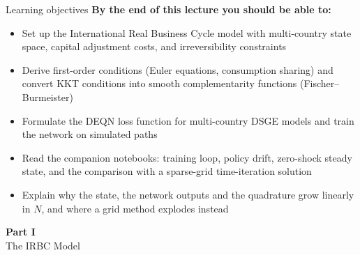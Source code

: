 \documentclass[aspectratio=169,11pt]{beamer}
\begin{document}
\begin{frame}{Learning objectives}
\textbf{By the end of this lecture you should be able to:}
\begin{itemize}
  \item Set up the International Real Business Cycle model with multi-country state space, capital adjustment costs, and irreversibility constraints
  \item Derive first-order conditions (Euler equations, consumption sharing) and convert KKT conditions into smooth complementarity functions (Fischer--Burmeister)
  \item Formulate the DEQN loss function for multi-country DSGE models and train the network on simulated paths
  \item Read the companion notebooks: training loop, policy drift, zero-shock steady state, and the comparison with a sparse-grid time-iteration solution
  \item Explain why the state, the network outputs and the quadrature grow linearly in $N$, and where a grid method explodes instead
\end{itemize}
\end{frame}



\begin{frame}{}
\vfill
\begin{center}
{\Huge \textcolor{uzhblue}{\textbf{Part I}}}\\[12pt]
{\LARGE The IRBC Model}
\end{center}
\vfill
\end{frame}
\end{document}
